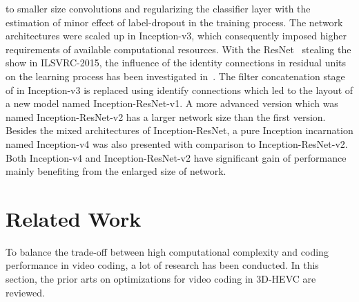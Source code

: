 to smaller size convolutions and regularizing the classifier layer with
the estimation of minor effect of label-dropout in the training process.
The network architectures were scaled up in Inception-v3, which consequently
imposed higher requirements of available computational resources.
With the ResNet~\parencite{RN67} stealing the show in ILSVRC-2015,
the influence of the
identity connections in residual units on the learning process
has been investigated in~\parencite{RN63}.
The filter concatenation stage of in Inception-v3 is replaced using identify
connections which led to the layout of a new model named Inception-ResNet-v1.
A more advanced version which was named Inception-ResNet-v2 has a larger
network size than the first version.
Besides the mixed architectures of Inception-ResNet, a pure Inception
incarnation named Inception-v4 was also presented with comparison to
Inception-ResNet-v2.
Both Inception-v4 and Inception-ResNet-v2 have significant gain of performance
mainly benefiting from the enlarged size of network.

\section{Related Work}\label{sec:related-work}
To balance the trade-off between high computational complexity and
coding performance in video coding, a lot of research has been conducted.
In this section, the prior arts on optimizations for video
coding in 3D-HEVC are reviewed.

